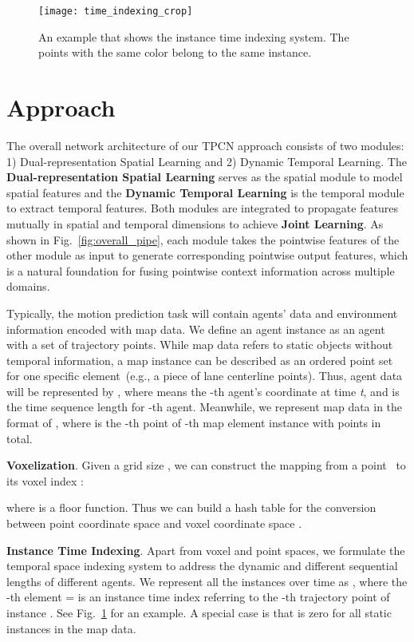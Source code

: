 \documentclass[final]{cvpr}
\begin{document}
\begin{figure}[t]
    \centering
    \texttt{[image: time\_indexing\_crop]}
    \caption{An example that shows the instance time indexing system. The points with the same color belong to the same instance.}
    \label{instance-time-indexing system}
    \vspace{-5px}
\end{figure}

\section{Approach}


The overall network architecture of our TPCN approach consists of two modules: 1) Dual-representation Spatial Learning and 2) Dynamic Temporal Learning. The \textbf{Dual-representation Spatial Learning} serves as the spatial module to model spatial features and the \textbf{Dynamic Temporal Learning} is the temporal module to extract temporal features. Both modules are integrated to propagate features mutually in spatial and temporal dimensions to achieve \textbf{Joint Learning}. 
As shown in Fig.~\ref{fig:overall_pipe}, each module takes the pointwise features of the other module as input to generate corresponding pointwise output features, which is a natural foundation for fusing pointwise context information across multiple domains. 



Typically, the motion prediction task will contain agents' data and environment information encoded with map data. 
We define an agent instance as an agent with a set of trajectory points. 
While map data refers to static objects without temporal information, a map instance can be described as an ordered point set for one specific element\ (e.g., a piece of lane centerline points).
Thus, agent data will be represented by 
, where  
means the -th agent's coordinate at time \textit{t}, and  is the time sequence length for -th agent. 
Meanwhile, we represent map data in the format of , where 
 is the -th point of -th map element instance with  points in total.

\textbf{Voxelization}. Given a grid size , we can construct the mapping from a point \ to its voxel index :

where  is a floor function. Thus we can build a hash table for the conversion between point coordinate space and voxel coordinate space . 


\textbf{Instance Time Indexing}. Apart from voxel and point spaces, we formulate the temporal space indexing system to address the dynamic and different sequential lengths of different agents. 
We represent all the instances over time as , where the -th element  =  is an instance time index referring to the -th trajectory point of instance .  See Fig.~\ref{instance-time-indexing system} for an example. A special case is that  is zero for all static instances in the map data.
\end{document}

